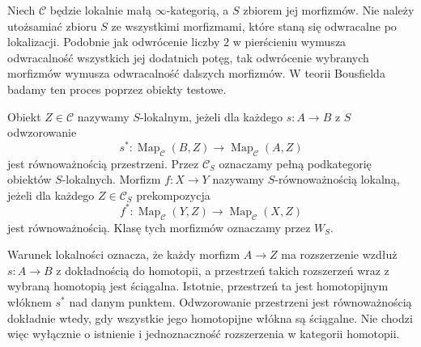Niech $\mathcal C$ będzie lokalnie małą $\infty$-kategorią, a $S$ zbiorem jej morfizmów. Nie należy utożsamiać zbioru $S$ ze wszystkimi morfizmami, które staną się odwracalne po lokalizacji. Podobnie jak odwrócenie liczby $2$ w pierścieniu wymusza odwracalność wszystkich jej dodatnich potęg, tak odwrócenie wybranych morfizmów wymusza odwracalność dalszych morfizmów. W teorii Bousfielda badamy ten proces poprzez obiekty testowe.

\begin{definicja}\label{cat:def:infty-bousfield-local}
Obiekt $Z\in\mathcal C$ nazywamy $S$-lokalnym, jeżeli dla każdego $s:A\to B$ z $S$ odwzorowanie
\[
 s^*:\operatorname{Map}_{\mathcal C}(B,Z)\longrightarrow
 \operatorname{Map}_{\mathcal C}(A,Z)
\]
jest równoważnością przestrzeni. Przez $\mathcal C_S$ oznaczamy pełną podkategorię obiektów $S$-lokalnych. Morfizm $f:X\to Y$ nazywamy $S$-równoważnością lokalną, jeżeli dla każdego $Z\in\mathcal C_S$ prekompozycja
\[
 f^*:\operatorname{Map}_{\mathcal C}(Y,Z)\longrightarrow
 \operatorname{Map}_{\mathcal C}(X,Z)
\]
jest równoważnością. Klasę tych morfizmów oznaczamy przez $W_S$.
\end{definicja}

Warunek lokalności oznacza, że każdy morfizm $A\to Z$ ma rozszerzenie wzdłuż $s:A\to B$ z dokładnością do homotopii, a przestrzeń takich rozszerzeń wraz z wybraną homotopią jest ściągalna. Istotnie, przestrzeń ta jest homotopijnym włóknem $s^*$ nad danym punktem. Odwzorowanie przestrzeni jest równoważnością dokładnie wtedy, gdy wszystkie jego homotopijne włókna są ściągalne. Nie chodzi więc wyłącznie o istnienie i jednoznaczność rozszerzenia w kategorii homotopii.


